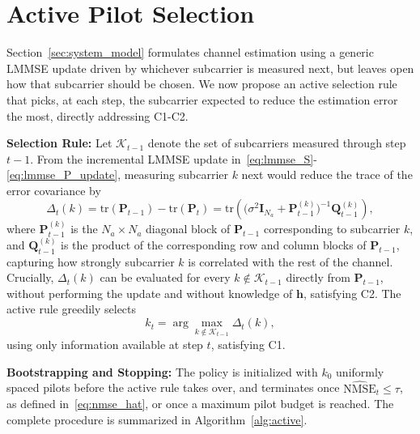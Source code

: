 \section{Active Pilot Selection}
\label{sec:method}

Section~\ref{sec:system_model} formulates channel estimation using a generic LMMSE update driven by whichever subcarrier is measured next, but leaves open how that subcarrier should be chosen. We now propose an active selection rule that picks, at each step, the subcarrier expected to reduce the estimation error the most, directly addressing C1-C2.

\smallskip
\noindent
{\bf Selection Rule:}
Let $\mathcal K_{t-1}$ denote the set of subcarriers measured through step $t-1$. From the incremental LMMSE update in~\eqref{eq:lmmse_S}-\eqref{eq:lmmse_P_update}, measuring subcarrier $k$ next would reduce the trace of the error covariance by
\begin{equation}
\Delta_t(k) = \mathrm{tr}(\mathbf P_{t-1}) - \mathrm{tr}(\mathbf P_t) = \mathrm{tr}\!\left( \bigl(\sigma^2\mathbf I_{N_a} + \mathbf P_{t-1}^{(k)}\bigr)^{-1} \mathbf Q_{t-1}^{(k)} \right),
\label{eq:active_score}
\end{equation}
where $\mathbf P_{t-1}^{(k)}$ is the $N_a\times N_a$ diagonal block of $\mathbf P_{t-1}$ corresponding to subcarrier $k$, and $\mathbf Q_{t-1}^{(k)}$ is the product of the corresponding row and column blocks of $\mathbf P_{t-1}$, capturing how strongly subcarrier $k$ is correlated with the rest of the channel. Crucially, $\Delta_t(k)$ can be evaluated for every $k \notin \mathcal K_{t-1}$ directly from $\mathbf P_{t-1}$, without performing the update and without knowledge of $\mathbf h$, satisfying C2. The active rule greedily selects
\begin{equation}
k_t = \arg\max_{k \notin \mathcal K_{t-1}} \Delta_t(k),
\label{eq:active_argmax}
\end{equation}
using only information available at step $t$, satisfying C1.

\smallskip
\noindent
{\bf Bootstrapping and Stopping:}
The policy is initialized with $k_0$ uniformly spaced pilots before the active rule takes over, and terminates once $\widehat{\mathrm{NMSE}}_t \le \tau$, as defined in~\eqref{eq:nmse_hat}, or once a maximum pilot budget is reached. The complete procedure is summarized in Algorithm~\ref{alg:active}.

